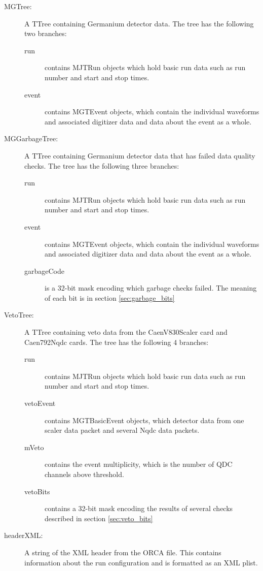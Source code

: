 \documentclass[/main.tex]{subfiles}
\begin{document}
\begin{description}
\item[MGTree:] A TTree containing Germanium detector data. The tree has the following two branches:
  \begin{description}
  \item[run] contains MJTRun objects which hold basic run data such as run number and start and stop times.
  \item[event] contains MGTEvent objects, which contain the individual waveforms and associated digitizer data and data about the event as a whole.
  \end{description}

\item[MGGarbageTree:] A TTree containing Germanium detector data that has failed data quality checks. The tree has the following three branches:
  \begin{description}
  \item[run] contains MJTRun objects which hold basic run data such as run number and start and stop times.
  \item[event] contains MGTEvent objects, which contain the individual waveforms and associated digitizer data and data about the event as a whole.
  \item[garbageCode] is a 32-bit mask encoding which garbage checks failed. The meaning of each bit is in section \ref{sec:garbage_bits}
  \end{description}

\item[VetoTree:] A TTree containing veto data from the CaenV830Scaler card and Caen792Nqdc cards. The tree has the following 4 branches:
  \begin{description}
  \item[run] contains MJTRun objects which hold basic run data such as run number and start and stop times.
  \item[vetoEvent] contains MGTBasicEvent objects, which detector data from one scaler data packet and several Nqdc data packets.
  \item[mVeto] contains the event multiplicity, which is the number of QDC channels above threshold.
  \item[vetoBits] contains a 32-bit mask encoding the results of several checks described in section \ref{sec:veto_bits}
  \end{description}

\item[headerXML:] A string of the XML header from the ORCA file. This contains information about the run configuration and is formatted as an XML plist.
  

\end{description}
\end{document}
